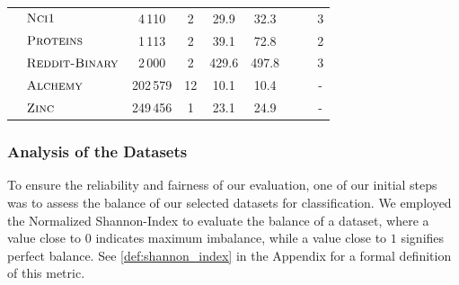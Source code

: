 \begin{table}[!htb]
\begin{center}
{\begin{tabular}{@{}c <{\enspace}@{}lccccccc@{}}
				& $\textsc{Nci1}$          & 4\,110            & 2                         & 29.9                          & 32.3                          & \cmark                   & \xmark   & 3   \\
				& $\textsc{Proteins}$      & 1\,113            & 2                         & 39.1                          & 72.8                          & \cmark                   & \xmark  & 2    \\
				& $\textsc{Reddit-Binary}$ & 2\,000            & 2                         & 429.6                         & 497.8                         & \xmark                   & \xmark & 3     \\ 
				\midrule
				\multirow{2}{*}{\rotatebox{90}{Reg.}}
				& $\textsc{Alchemy}$       & 202\,579          & 12                        & 10.1                          & 10.4                         & \cmark                   & \cmark & -     \\
				& $\textsc{Zinc}$       & 249\,456          & 1                        & 23.1                         & 24.9                          & \cmark                   & \cmark & -     \\
				\bottomrule
			\end{tabular}}
	\end{center}
\end{table}

\subsubsection{Analysis of the Datasets}
To ensure the reliability and fairness of our evaluation, one of our initial steps was to assess the balance of our selected datasets for classification. We employed the \textsf{Normalized Shannon-Index} to evaluate the balance of a dataset, where a value close to $0$ indicates maximum imbalance, while a value close to $1$ signifies perfect balance. See \cref{def:shannon_index} in the Appendix for a formal definition of this metric.

\begin{table}[!htb]
	\caption{An overview of the \textsf{Normalized Shannon-Index} calculated for each dataset.}
	\label{tab:shannon_index}
	\centering
\end{table}

